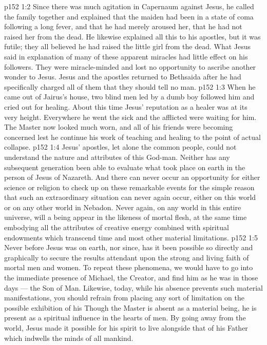 \vs p152 1:2 Since there was much agitation in Capernaum against Jesus, he called the family together and explained that the maiden had been in a state of coma following a long fever, and that he had merely aroused her, that he had not raised her from the dead. He likewise explained all this to his apostles, but it was futile; they all believed he had raised the little girl from the dead. What Jesus said in explanation of many of these apparent miracles had little effect on his followers. They were miracle\hyp{}minded and lost no opportunity to ascribe another wonder to Jesus. Jesus and the apostles returned to Bethsaida after he had specifically charged all of them that they should tell no man.
\vs p152 1:3 \pc When he came out of Jairus’s house, two blind men led by a dumb boy followed him and cried out for healing. About this time Jesus’ reputation as a healer was at its very height. Everywhere he went the sick and the afflicted were waiting for him. The Master now looked much worn, and all of his friends were becoming concerned lest he continue his work of teaching and healing to the point of actual collapse.
\vs p152 1:4 \pc Jesus’ apostles, let alone the common people, could not understand the nature and attributes of this God\hyp{}man. Neither has any subsequent generation been able to evaluate what took place on earth in the person of Jesus of Nazareth. And there can never occur an opportunity for either science or religion to check up on these remarkable events for the simple reason that such an extraordinary situation can never again occur, either on this world or on any other world in Nebadon. Never again, on any world in this entire universe, will a being appear in the likeness of mortal flesh, at the same time embodying all the attributes of creative energy combined with spiritual endowments which transcend time and most other material limitations.
\vs p152 1:5 Never before Jesus was on earth, nor since, has it been possible so directly and graphically to secure the results attendant upon the strong and living faith of mortal men and women. To repeat these phenomena, we would have to go into the immediate presence of Michael, the Creator, and find him as he was in those days --- the Son of Man. Likewise, today, while his absence prevents such material manifestations, you should refrain from placing any sort of limitation on the possible exhibition of his  Though the Master is absent as a material being, he is present as a spiritual influence in the hearts of men. By going away from the world, Jesus made it possible for his spirit to live alongside that of his Father which indwells the minds of all mankind.
